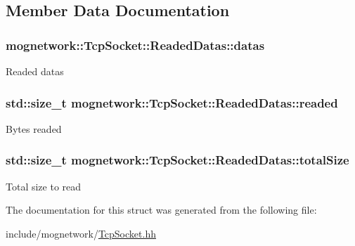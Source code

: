 \subsection{Member Data Documentation}
\hypertarget{structmognetwork_1_1_tcp_socket_1_1_readed_datas_abfdc3750f4970fde4212d7a0e934daa9}{
\subsubsection[{datas}]{ mognetwork\-::\-Tcp\-Socket\-::\-Readed\-Datas\-::datas}}\label{structmognetwork_1_1_tcp_socket_1_1_readed_datas_abfdc3750f4970fde4212d7a0e934daa9}
Readed datas \hypertarget{structmognetwork_1_1_tcp_socket_1_1_readed_datas_a2c633a79efa956f1f59d9429e8584cc0}{
\subsubsection[{readed}]{\setlength{\rightskip}{0pt plus 5cm}std\-::size\-\_\-t mognetwork\-::\-Tcp\-Socket\-::\-Readed\-Datas\-::readed}}\label{structmognetwork_1_1_tcp_socket_1_1_readed_datas_a2c633a79efa956f1f59d9429e8584cc0}
Bytes readed \hypertarget{structmognetwork_1_1_tcp_socket_1_1_readed_datas_aac0aa498d4b98296434cf05785068dcc}{
\subsubsection[{total\-Size}]{\setlength{\rightskip}{0pt plus 5cm}std\-::size\-\_\-t mognetwork\-::\-Tcp\-Socket\-::\-Readed\-Datas\-::total\-Size}}\label{structmognetwork_1_1_tcp_socket_1_1_readed_datas_aac0aa498d4b98296434cf05785068dcc}
Total size to read 

The documentation for this struct was generated from the following file\-:\begin{DoxyCompactItemize}
\item 
include/mognetwork/\hyperlink{_tcp_socket_8hh}{Tcp\-Socket.\-hh}\end{DoxyCompactItemize}
